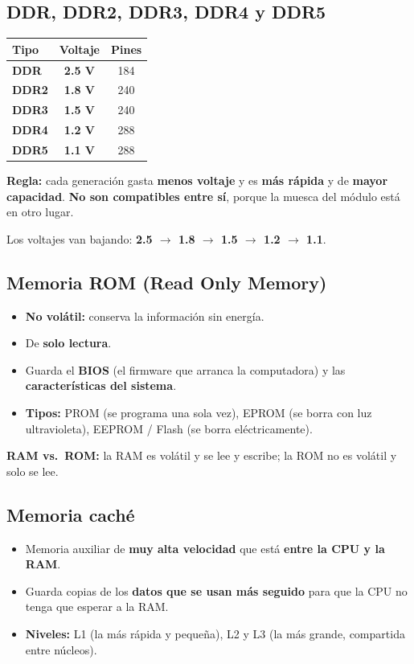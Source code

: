 \documentclass[11pt,a4paper]{article}
\newcommand{\clave}[1]{\textbf{\color{acento}#1}}
\begin{document}
\subsection{DDR, DDR2, DDR3, DDR4 y DDR5}
\begin{center}
\begin{tabular}{>{\bfseries}lcc}
\toprule
Tipo & Voltaje & Pines \\
\midrule
DDR  & \clave{2.5 V} & 184 \\
DDR2 & \clave{1.8 V} & 240 \\
DDR3 & \clave{1.5 V} & 240 \\
DDR4 & \clave{1.2 V} & 288 \\
DDR5 & \clave{1.1 V} & 288 \\
\bottomrule
\end{tabular}
\end{center}
\textbf{Regla:} cada generación gasta \textbf{menos voltaje} y es \textbf{más rápida} y de \textbf{mayor capacidad}.
\textbf{No son compatibles entre sí}, porque la muesca del módulo está en otro lugar.
\begin{truco}
Los voltajes van bajando: \textbf{2.5 $\rightarrow$ 1.8 $\rightarrow$ 1.5 $\rightarrow$ 1.2 $\rightarrow$ 1.1}.
\end{truco}

\subsection{Memoria ROM (Read Only Memory)}
\begin{itemize}
  \item \clave{No volátil:} conserva la información sin energía.
  \item De \textbf{solo lectura}.
  \item Guarda el \clave{BIOS} (el firmware que arranca la computadora) y las \textbf{características del sistema}.
  \item \textbf{Tipos:} PROM (se programa una sola vez), EPROM (se borra con luz ultravioleta),
        EEPROM / Flash (se borra eléctricamente).
\end{itemize}
\begin{nota}
\textbf{RAM vs.\ ROM:} la RAM es volátil y se lee y escribe; la ROM no es volátil y solo se lee.
\end{nota}

\subsection{Memoria caché}
\begin{itemize}
  \item Memoria auxiliar de \clave{muy alta velocidad} que está \clave{entre la CPU y la RAM}.
  \item Guarda copias de los \textbf{datos que se usan más seguido} para que la CPU no tenga que esperar a la RAM.
  \item \textbf{Niveles:} L1 (la más rápida y pequeña), L2 y L3 (la más grande, compartida entre núcleos).
\end{itemize}
\end{document}
